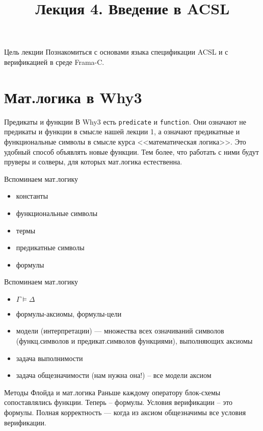 \documentclass[hyperref={unicode=true}]{beamer}
\title{Лекция 4. Введение в ACSL}
\author{}
\date{}
\begin{document}
	\begin{frame}{}
		\titlepage
	\end{frame}

    \begin{frame}{Цель лекции}
    Познакомиться с основами языка спецификации ACSL и с верификацией в
    среде Frama-C.
    \end{frame}

    \section{Мат.логика в Why3}

    \begin{frame}{Предикаты и функции}
    В Why3 есть \texttt{predicate} и \texttt{function}. Они означают не предикаты и функции в смысле нашей лекции 1, а означают предикатные и функциональные символы в смысле курса <<математическая логика>>. Это удобный способ объявлять новые функции. Тем более, что работать с ними будут пруверы и солверы, для которых мат.логика естественна.
    \end{frame}

    \begin{frame}{Вспоминаем мат.логику}
    \begin{itemize}
    \item константы
    \item функциональные символы
    \item термы
    \item предикатные символы
    \item формулы
    \end{itemize}
    \end{frame}

    \begin{frame}{Вспоминаем мат.логику}
    \begin{itemize}
    \item $\Gamma \models \Delta$
    \item формулы-аксиомы, формулы-цели
    \item модели (интерпретации) --- множества всех означиваний символов (функц.символов и предикат.символов функциями), выполняющих аксиомы
    \item задача выполнимости
    \item задача общезначимости (нам нужна она!) -- все модели аксиом
    \end{itemize}
    \end{frame}

    \begin{frame}{Методы Флойда и мат.логика}
    Раньше каждому оператору блок-схемы сопоставлялись функции. Теперь -- формулы. Условия верификации -- это формулы. Полная корректность --- когда из аксиом общезначимы все условия верификации.
    \end{frame}
\end{document}
